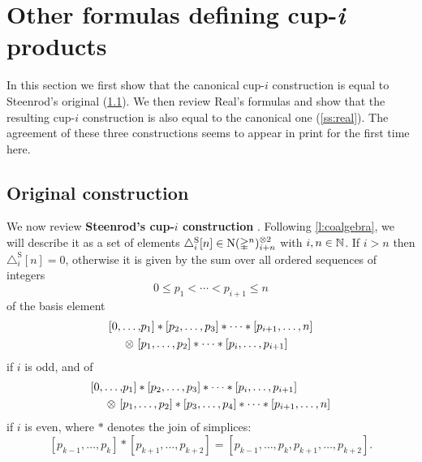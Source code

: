 
\section{Other formulas defining cup-\textit{i} products}\label{s:others}

In this section we first show that the canonical \mbox{cup-$i$} construction is equal to Steenrod's original (\cref{ss:original}).
We then review Real's formulas and show that the resulting \mbox{cup-$i$} construction is also equal to the canonical one (\cref{ss:real}).
The agreement of these three constructions seems to appear in print for the first time here.

\subsection{Original construction}\label{ss:original}

We now review \textbf{Steenrod's \mbox{cup-$i$} construction} \cite[p.293]{steenrod1947products}.
Following \cref{l:coalgebra}, we will describe it as a set of elements $\triangle_i^{\mathrm{S}} [n] \in \operatorname{N}(\mathbb{\Delta}^n)^{\otimes 2}_{i+n}$ with $i,n \in \mathbb{N}$.
If $i > n$ then $\triangle_i^{\mathrm{S}} [n] = 0$, otherwise it is given by the sum over all ordered sequences of integers
\[
0 \leq p_1 < \cdots < p_{i+1} \leq n
\]
of the basis element
\begin{equation}\label{e:original i odd}
\begin{split}
[ 0, \dots, &{p_1} ] \ast [ {p_2}, \dots, {p_3} ] \ast \cdots \ast [ {p_{i+1}}, \dots, n ] \\
\otimes \ [ &{p_1}, \dots, {p_2} ] \ast \cdots \ast [ {p_{i}}, \dots, {p_{i+1}} ]
\end{split}
\end{equation}
if $i$ is odd, and of
\begin{equation}\label{e:original i even}
\begin{split}
[ 0, \dots, &{p_1} ] \ast [ {p_2}, \dots, {p_3} ] \ast \cdots \ast [ {p_{i}}, \dots, {p_{i+1}} ] \\
\otimes \ [ &{p_1}, \dots, {p_2} ] \ast [ {p_3}, \dots, {p_4} ] \ast \cdots \ast [ {p_{i+1}}, \dots, n ]
\end{split}
\end{equation}
if $i$ is even, where $\ast$ denotes the join of simplices:
\[
[{p_{k-1}}, \dots, {p_{k}} ] \ast [ {p_{k+1}}, \dots, p_{k+2}] = [{p_{k-1}}, \dots, p_k, p_{k+1}, \dots, p_{k+2}].
\]

